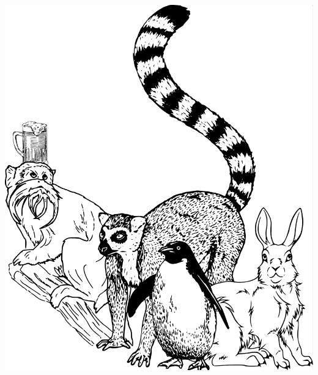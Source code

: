 \documentclass[a5paper,ngerman,xcolor=dvipsnames]{scrartcl}
\begin{document}
\begin{center}
\includegraphics[scale=0.265]{akw.pdf}
\end{center}
\end{document}
